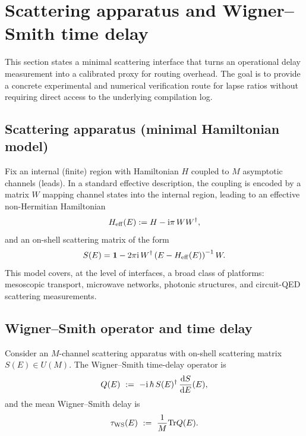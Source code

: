 \section{Scattering apparatus and Wigner--Smith time delay}
\label{sec:wigner_smith}

This section states a minimal scattering interface that turns an operational delay measurement into a calibrated proxy for routing overhead.
The goal is to provide a concrete experimental and numerical verification route for lapse ratios without requiring direct access to the underlying compilation log.

\subsection{Scattering apparatus (minimal Hamiltonian model)}
\label{subsec:scattering_apparatus}

Fix an internal (finite) region with Hamiltonian $H$ coupled to $M$ asymptotic channels (leads).
In a standard effective description, the coupling is encoded by a matrix $W$ mapping channel states into the internal region, leading to an effective non-Hermitian Hamiltonian
\begin{equation}
  H_{\mathrm{eff}}(E) := H - \mathrm{i}\pi\,W W^\dagger,
\end{equation}
and an on-shell scattering matrix of the form \cite{MahauxWeidenmueller1969,Datta1995}
\begin{equation}
  S(E) = \mathbf{1} - 2\pi\mathrm{i}\,W^\dagger\left(E - H_{\mathrm{eff}}(E)\right)^{-1}W.
  \label{eq:weidenmueller_S}
\end{equation}
This model covers, at the level of interfaces, a broad class of platforms: mesoscopic transport, microwave networks, photonic structures, and circuit-QED scattering measurements.

\subsection{Wigner--Smith operator and time delay}
\label{subsec:wigner_smith_def}

Consider an $M$-channel scattering apparatus with on-shell scattering matrix $S(E)\in U(M)$.
The Wigner--Smith time-delay operator \cite{Wigner1955,Smith1960} is
\begin{equation}
  Q(E)\ :=\ -\mathrm{i}\,\hbar\,S(E)^\dagger\,\frac{\mathrm{d} S}{\mathrm{d} E}(E),
  \label{eq:wigner_smith_Q}
\end{equation}
and the mean Wigner--Smith delay is
\begin{equation}
  \tau_{\mathrm{WS}}(E)\ :=\ \frac{1}{M}\mathrm{Tr} Q(E).
  \label{eq:wigner_smith_tau}
\end{equation}

